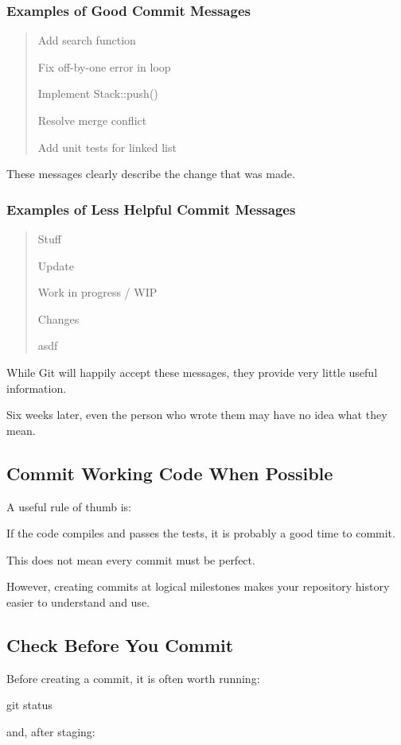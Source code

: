 \documentclass{csc2059practical}
\begin{document}
\subsubsection{Examples of Good Commit Messages}
\begin{quote}
  Add search function
  
  Fix off-by-one error in loop
  
  Implement Stack::push()
  
  Resolve merge conflict
  
  Add unit tests for linked list
\end{quote}

These messages clearly describe the change that was made.

\subsubsection{Examples of Less Helpful Commit Messages}

\begin{quote}
  Stuff
  
  Update
  
  Work in progress / WIP
  
  Changes
  
  asdf
\end{quote}

While Git will happily accept these messages, they provide very little useful information.

Six weeks later, even the person who wrote them may have no idea what they mean.

\subsection{Commit Working Code When Possible}
A useful rule of thumb is:

If the code compiles and passes the tests, it is probably a good time to commit.

This does not mean every commit must be perfect.

However, creating commits at logical milestones makes your repository history easier to understand and use.

\subsection{Check Before You Commit}
Before creating a commit, it is often worth running:

\begin{terminalplain}
git status
\end{terminalplain}
and, after staging:
\end{document}
